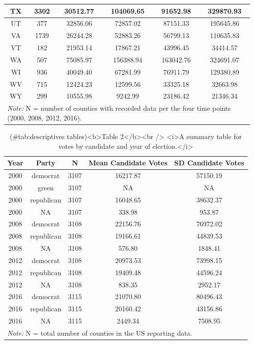 \documentclass[
  english,
  man]{apa6}
\begin{document}
\begin{table}
\begin{tabular}[t]{c|c|c|c|c|c}
TX & 3302 & 30512.77 & 104069.65 & 91652.98 & 329870.93\\
\hline
UT & 377 & 32856.06 & 72857.02 & 87151.33 & 195645.86\\
\hline
VA & 1739 & 26244.28 & 52883.26 & 56799.13 & 110635.83\\
\hline
VT & 182 & 21953.14 & 17867.21 & 43996.45 & 34414.57\\
\hline
WA & 507 & 75085.97 & 156388.94 & 163042.76 & 324691.07\\
\hline
WI & 936 & 40049.40 & 67281.99 & 76911.79 & 129380.89\\
\hline
WV & 715 & 12424.23 & 12599.56 & 33325.18 & 32663.98\\
\hline
WY & 299 & 10555.98 & 9242.99 & 23186.42 & 21346.34\\
\hline
\multicolumn{6}{l}{\rule{0pt}{1em}\textit{Note: } N = number of counties with recorded data per the four time points (2000, 2008, 2012, 2016).}\\
\end{tabular}
\end{table}

\begin{table}

\caption{(\#tab:descriptives tables)<b>Table 2</b><br /> <i>A summary table for votes by candidate and year of election.</i>}
\centering
\begin{tabular}[t]{c|c|c|c|c}
\hline
Year & Party & N & Mean Candidate Votes & SD Candidate Votes\\
\hline
2000 & democrat & 3107 & 16217.87 & 57150.19\\
\hline
2000 & green & 3107 & NA & NA\\
\hline
2000 & republican & 3107 & 16048.65 & 38632.37\\
\hline
2000 & NA & 3107 & 338.98 & 953.87\\
\hline
2008 & democrat & 3108 & 22156.76 & 76972.02\\
\hline
2008 & republican & 3108 & 19166.61 & 44839.53\\
\hline
2008 & NA & 3108 & 576.80 & 1848.41\\
\hline
2012 & democrat & 3108 & 20973.53 & 73998.15\\
\hline
2012 & republican & 3108 & 19409.48 & 44596.24\\
\hline
2012 & NA & 3108 & 838.35 & 2952.17\\
\hline
2016 & democrat & 3115 & 21070.80 & 80496.43\\
\hline
2016 & republican & 3115 & 20160.42 & 43156.86\\
\hline
2016 & NA & 3115 & 2449.34 & 7508.95\\
\hline
\multicolumn{5}{l}{\rule{0pt}{1em}\textit{Note: } N = total number of counties in the US reporting data.}\\
\end{tabular}
\end{table}
\end{document}
